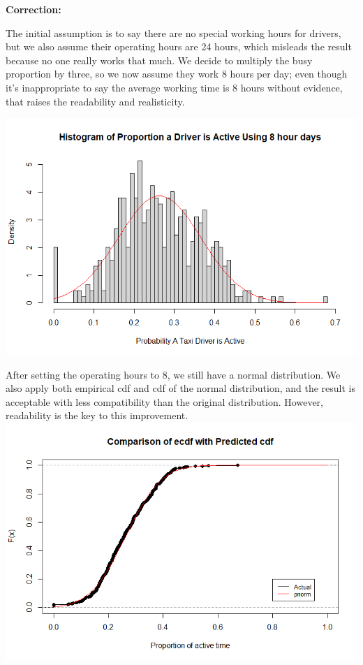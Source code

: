 \documentclass[11pt]{article}
\begin{document}
\noindent\textbf{Correction:}\\
\par
The initial assumption is to say there are no special working hours for drivers, but we also assume their operating hours are 24 hours,
which misleads the result because no one really works that much. We decide to multiply the busy proportion by three, so we now assume they
work 8 hours per day; even though it’s inappropriate to say the average working time is 8 hours without evidence, that raises the readability
and realisticity.

\noindent\includegraphics{8_hour_busy_time.png}\\
\par
After setting the operating hours to 8, we still have a normal distribution. We also apply both empirical cdf and cdf of the normal distribution,
and the result is acceptable with less compatibility than the original distribution. However, readability is the key to this improvement.\\

\noindent\includegraphics{8_hour_busy_time_cdf.png}\\
\end{document}

